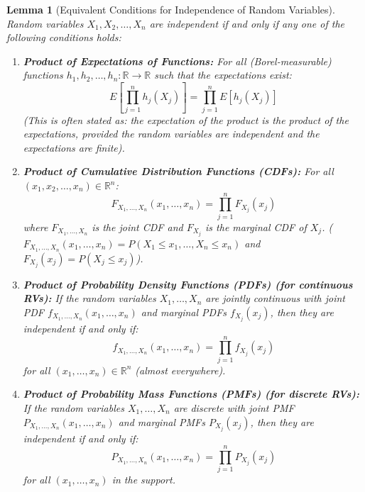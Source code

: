 \documentclass[11pt]{article}
\newtheorem{lemma}[theorem]{Lemma}
\begin{document}
\begin{lemma}[Equivalent Conditions for Independence of Random Variables]
\label{lemma:equiv_independence}
Random variables $X_1, X_2, \dots, X_n$ are independent if and only if any one of the following conditions holds:
\begin{enumerate}
    \item \textbf{Product of Expectations of Functions:} For all (Borel-measurable) functions $h_1, h_2, \dots, h_n: \mathbb{R} \to \mathbb{R}$ such that the expectations exist:
    \begin{equation}
    E\left[\prod_{j=1}^n h_j(X_j)\right] = \prod_{j=1}^n E[h_j(X_j)]
    \end{equation}
    (This is often stated as: the expectation of the product is the product of the expectations, provided the random variables are independent and the expectations are finite).

    \item \textbf{Product of Cumulative Distribution Functions (CDFs):} For all $(x_1, x_2, \dots, x_n) \in \mathbb{R}^n$:
    \begin{equation}
    F_{X_1, \dots, X_n}(x_1, \dots, x_n) = \prod_{j=1}^n F_{X_j}(x_j)
    \end{equation}
    where $F_{X_1, \dots, X_n}$ is the joint CDF and $F_{X_j}$ is the marginal CDF of $X_j$.
    ($F_{X_1, \dots, X_n}(x_1, \dots, x_n) = P(X_1 \le x_1, \dots, X_n \le x_n)$ and $F_{X_j}(x_j) = P(X_j \le x_j)$).

    \item \textbf{Product of Probability Density Functions (PDFs) (for continuous RVs):} If the random variables $X_1, \dots, X_n$ are jointly continuous with joint PDF $f_{X_1, \dots, X_n}(x_1, \dots, x_n)$ and marginal PDFs $f_{X_j}(x_j)$, then they are independent if and only if:
    \begin{equation}
    f_{X_1, \dots, X_n}(x_1, \dots, x_n) = \prod_{j=1}^n f_{X_j}(x_j)
    \end{equation}
    for all $(x_1, \dots, x_n) \in \mathbb{R}^n$ (almost everywhere).

    \item \textbf{Product of Probability Mass Functions (PMFs) (for discrete RVs):} If the random variables $X_1, \dots, X_n$ are discrete with joint PMF $P_{X_1, \dots, X_n}(x_1, \dots, x_n)$ and marginal PMFs $P_{X_j}(x_j)$, then they are independent if and only if:
    \begin{equation}
    P_{X_1, \dots, X_n}(x_1, \dots, x_n) = \prod_{j=1}^n P_{X_j}(x_j)
    \end{equation}
    for all $(x_1, \dots, x_n)$ in the support.
\end{enumerate}
\end{lemma}
\end{document}

